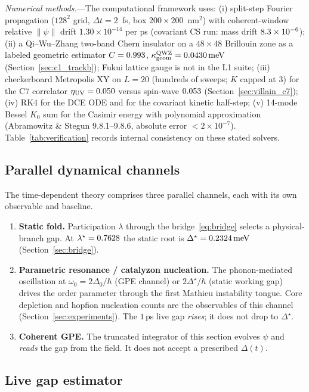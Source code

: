 \documentclass[11pt,letterpaper]{article}
\begin{document}
\textit{Numerical methods.}---The computational framework uses: (i) split-step Fourier propagation ($128^2$ grid, $\Delta t = 2$~fs, box $200 \times 200$~nm$^2$) with coherent-window relative $\|\psi\|$ drift $1.30\times 10^{-14}$ per ps (covariant CS run: mass drift $8.3\times 10^{-6}$); (ii) a Qi--Wu--Zhang two-band Chern insulator on a $48\times 48$ Brillouin zone as a labeled geometric estimator $C=0.993$, $\kappa_{\mathrm{geom}}^{\mathrm{QWZ}}=0.0430\,\mathrm{meV}$ (Section~\ref{sec:c1_trackb}); Fukui lattice gauge is not in the L1 suite; (iii) checkerboard Metropolis XY on $L=20$ (hundreds of sweeps; $K$ capped at $3$) for the C7 correlator $\eta_{\mathrm{UV}}=0.050$ versus spin-wave $0.053$ (Section~\ref{sec:villain_c7}); (iv) RK4 for the DCE ODE and for the covariant kinetic half-step; (v) 14-mode Bessel $K_0$ sum for the Casimir energy with polynomial approximation (Abramowitz \& Stegun 9.8.1--9.8.6, absolute error $< 2 \times 10^{-7}$). Table~\ref{tab:verification} records internal consistency on these stated solvers.

\subsection{Parallel dynamical channels}

The time-dependent theory comprises three parallel channels, each with its own observable and baseline.

\begin{enumerate}
    \item \textbf{Static fold.} Participation $\lambda$ through the bridge~\eqref{eq:bridge} selects a physical-branch gap. At $\lambda^\star=0.7628$ the static root is $\Delta^\star=0.2324\,\mathrm{meV}$ (Section~\ref{sec:bridge}).
    \item \textbf{Parametric resonance / catalyzon nucleation.} The phonon-mediated oscillation at $\omega_0 = 2\Delta_0/\hbar$ (GPE channel) or $2\Delta^\star/\hbar$ (static working gap) drives the order parameter through the first Mathieu instability tongue. Core depletion and hopfion nucleation counts are the observables of this channel (Section~\ref{sec:experiments}). The $1$\,ps live gap \emph{rises}; it does not drop to $\Delta^\star$.
    \item \textbf{Coherent GPE.} The truncated integrator of this section evolves $\psi$ and \emph{reads} the gap from the field. It does not accept a prescribed $\Delta(t)$.
\end{enumerate}

\subsection{Live gap estimator}
\end{document}

